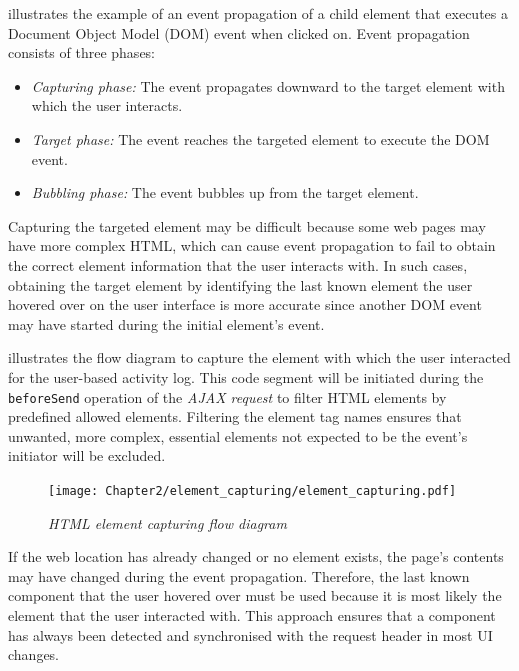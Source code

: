  illustrates the example of an event propagation of a child element that executes a Document Object Model (DOM) event when clicked on. Event propagation consists of three phases:

\begin{itemize}
	\item \textit{Capturing phase:} The event propagates downward to the target element with which the user interacts.
	\item \textit{Target phase:} The event reaches the targeted element to execute the DOM event.
	\item \textit{Bubbling phase:} The event bubbles up from the target element.
\end{itemize}

Capturing the targeted element may be difficult because some web pages may have more complex HTML, which can cause event propagation to fail to obtain the correct element information that the user interacts with. In such cases, obtaining the target element by identifying the last known element the user hovered over on the user interface is more accurate since another DOM event may have started during the initial element's event.\par {} illustrates the flow diagram to capture the element with which the user interacted for the user-based activity log. This code segment will be initiated during the \texttt{beforeSend} operation of the \textit{AJAX request} to filter HTML elements by predefined allowed elements. Filtering the element tag names ensures that unwanted, more complex, essential elements not expected to be the event's initiator will be excluded. 

\begin{figure}[!htb]
	\centering %
	\texttt{[image: Chapter2/element\_capturing/element\_capturing.pdf]}
	\caption[HTML element capturing flow diagram]
	{\textit{HTML element capturing flow diagram}}\label{fig:ch3_element_event_capturing}
\end{figure}

If the web location has already changed or no element exists, the page's contents may have changed during the event propagation. Therefore, the last known component that the user hovered over must be used because it is most likely the element that the user interacted with. This approach ensures that a component has always been detected and synchronised with the request header in most UI changes.

